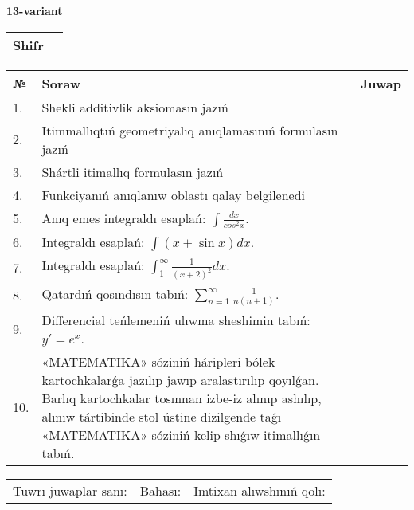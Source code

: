 \documentclass{article}
\begin{document}
  \egroup
  
  \newpage
  
  
  \textbf{13-variant}\\
  
  \bgroup
  \def\arraystretch{1.6} %
  
  \begin{tabular}{|m{5.7cm}|m{9.5cm}|}
  \hline
  Shifr & \\
  \hline
  \end{tabular}
  
  \vspace{1cm}
  
  \begin{tabular}{|m{0.7cm}|m{10cm}|m{4cm}|}
  \hline
  № & Soraw & Juwap \\
  \hline
  1. & Shekli additivlik aksiomasın jazıń &  \\
  \hline
  2. & Itimmallıqtıń geometriyalıq anıqlamasınıń formulasın jazıń &  \\
  \hline
  3. & Shártli itimallıq formulasın jazıń &  \\
  \hline
  4. & Funkciyanıń anıqlanıw oblastı qalay belgilenedi &  \\
  \hline
  5. & Anıq emes integraldı esaplań: \(\int\frac{dx}{cos^2 x}\). &  \\
  \hline
  6. & Integraldı esaplań: \(\int{(x + \sin x)dx}\). &  \\
  \hline
  7. & Integraldı esaplań: \(\int_{1}^{\infty}{\frac{1}{(x + 2)^2 }dx}\). &  \\
  \hline
  8. & Qatardıń qosındısın tabıń: \(\sum_{n = 1}^{\infty}\frac{1}{n(n + 1)}\). &  \\
  \hline
  9. & Differencial teńlemeniń ulıwma sheshimin tabıń: \(y' = e^{x}\). &  \\
  \hline
  10. & «MATEMATIKA» sóziniń háripleri bólek kartochkalarǵa jazılıp jawıp aralastırılıp qoyılǵan. Barlıq kartochkalar tosınnan izbe-iz alınıp ashılıp, alınıw tártibinde stol ústine dizilgende taǵı «MATEMATIKA» sóziniń kelip shıǵıw itimallıǵın tabıń. &  \\
  \hline
  \end{tabular}
  
  \vspace{1cm}
  
  \begin{tabular}{lll}
  Tuwrı juwaplar sanı: \underline{\hspace{1.5cm}} & 
  Bahası: \underline{\hspace{1.5cm}} & 
  Imtixan alıwshınıń qolı: \underline{\hspace{2cm}} \\
  \end{tabular}
  
\end{document}

